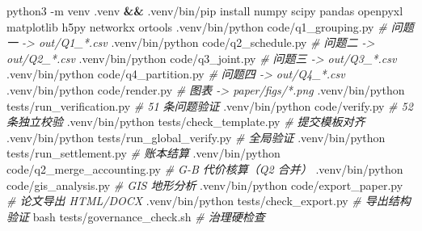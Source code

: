 \documentclass[
  10.5pt,
]{article}
\newenvironment{Shaded}{}{}
\newcommand{\AttributeTok}[1]{\textcolor[rgb]{0.49,0.56,0.16}{#1}}
\newcommand{\CommentTok}[1]{\textcolor[rgb]{0.38,0.63,0.69}{\textit{#1}}}
\newcommand{\ExtensionTok}[1]{#1}
\newcommand{\FunctionTok}[1]{\textcolor[rgb]{0.02,0.16,0.49}{#1}}
\newcommand{\KeywordTok}[1]{\textcolor[rgb]{0.00,0.44,0.13}{\textbf{#1}}}
\newcommand{\NormalTok}[1]{#1}
\begin{document}
\begin{Shaded}
\begin{Highlighting}[]
\ExtensionTok{python3} \AttributeTok{{-}m}\NormalTok{ venv .venv }\KeywordTok{\&\&} \ExtensionTok{.venv/bin/pip}\NormalTok{ install numpy scipy pandas openpyxl matplotlib h5py networkx ortools}
\ExtensionTok{.venv/bin/python}\NormalTok{ code/q1\_grouping.py      }\CommentTok{\# 问题一 {-}\textgreater{} out/Q1\_*.csv}
\ExtensionTok{.venv/bin/python}\NormalTok{ code/q2\_schedule.py      }\CommentTok{\# 问题二 {-}\textgreater{} out/Q2\_*.csv}
\ExtensionTok{.venv/bin/python}\NormalTok{ code/q3\_joint.py         }\CommentTok{\# 问题三 {-}\textgreater{} out/Q3\_*.csv}
\ExtensionTok{.venv/bin/python}\NormalTok{ code/q4\_partition.py     }\CommentTok{\# 问题四 {-}\textgreater{} out/Q4\_*.csv}
\ExtensionTok{.venv/bin/python}\NormalTok{ code/render.py           }\CommentTok{\# 图表 {-}\textgreater{} paper/figs/*.png}
\ExtensionTok{.venv/bin/python}\NormalTok{ tests/run\_verification.py    }\CommentTok{\# 51 条问题验证}
\ExtensionTok{.venv/bin/python}\NormalTok{ code/verify.py               }\CommentTok{\# 52 条独立校验}
\ExtensionTok{.venv/bin/python}\NormalTok{ tests/check\_template.py      }\CommentTok{\# 提交模板对齐}
\ExtensionTok{.venv/bin/python}\NormalTok{ tests/run\_global\_verify.py   }\CommentTok{\# 全局验证}
\ExtensionTok{.venv/bin/python}\NormalTok{ tests/run\_settlement.py      }\CommentTok{\# 账本结算}
\ExtensionTok{.venv/bin/python}\NormalTok{ code/q2\_merge\_accounting.py  }\CommentTok{\# G{-}B 代价核算（Q2 合并）}
\ExtensionTok{.venv/bin/python}\NormalTok{ code/gis\_analysis.py         }\CommentTok{\# GIS 地形分析}
\ExtensionTok{.venv/bin/python}\NormalTok{ code/export\_paper.py         }\CommentTok{\# 论文导出 HTML/DOCX}
\ExtensionTok{.venv/bin/python}\NormalTok{ tests/check\_export.py        }\CommentTok{\# 导出结构验证}
\FunctionTok{bash}\NormalTok{ tests/governance\_check.sh                }\CommentTok{\# 治理硬检查}
\end{Highlighting}
\end{Shaded}
\end{document}
